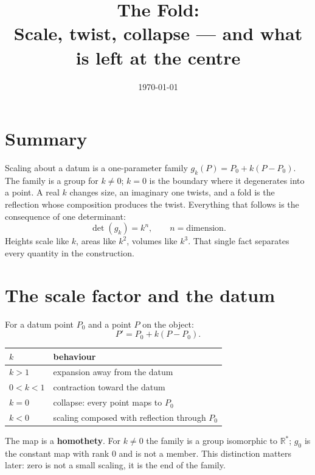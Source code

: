 \documentclass[11pt,fleqn]{article}
\title{\textbf{The Fold:\\Scale, twist, collapse --- and what is left at the centre}}
\author{}
\date{\today}
\begin{document}
\maketitle

\setcounter{section}{-1}

\section{Summary}

Scaling about a datum is a one-parameter family $g_k(P) = P_0 + k(P - P_0)$. The family is a
group for $k \neq 0$; $k = 0$ is the boundary where it degenerates into a point. A real $k$ changes
size, an imaginary one twists, and a fold is the reflection whose composition produces the twist.
Everything that follows is the consequence of one determinant:
\begin{equation}
\det(g_k) = k^n, \qquad n = \text{dimension}.
\end{equation}
Heights scale like $k$, areas like $k^2$, volumes like $k^3$. That single fact separates every
quantity in the construction.

\section{The scale factor and the datum}

For a datum point $P_0$ and a point $P$ on the object:
\begin{equation}
P' = P_0 + k(P - P_0).
\end{equation}

\begin{table}[H]
\centering
\begin{tabular}{@{}ll@{}}
\toprule
$k$ & behaviour \\
\midrule
$k > 1$ & expansion away from the datum \\
$0 < k < 1$ & contraction toward the datum \\
$k = 0$ & collapse: every point maps to $P_0$ \\
$k < 0$ & scaling composed with reflection through $P_0$ \\
\bottomrule
\end{tabular}
\end{table}

The map is a \textbf{homothety}. For $k \neq 0$ the family is a group isomorphic to
$\mathbb{R}^{*}$; $g_0$ is the constant map with rank $0$ and is not a member. This distinction
matters later: zero is not a small scaling, it is the end of the family.
\end{document}
